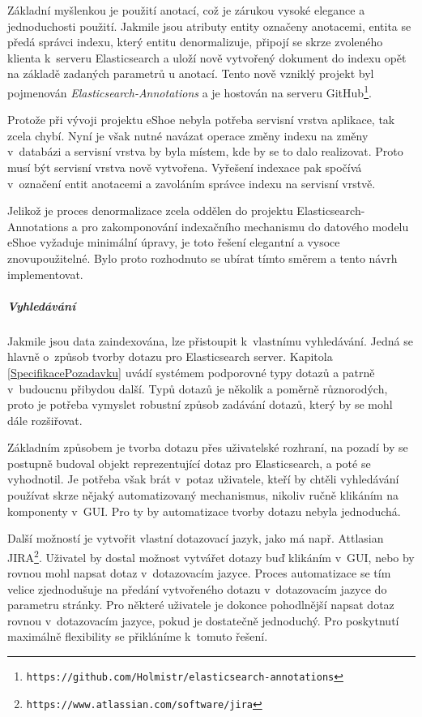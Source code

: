 \documentclass[11pt,oneside]{fithesis2}
\begin{document}
Základní myšlenkou je použití anotací, což je zárukou vysoké elegance a jednoduchosti použití. Jakmile jsou atributy entity označeny anotacemi, entita se předá správci indexu, který entitu denormalizuje, připojí se skrze zvoleného klienta k~serveru Elasticsearch a uloží nově vytvořený dokument do indexu opět na základě zadaných parametrů u anotací. Tento nově vzniklý projekt byl pojmenován \emph{Elasticsearch-Annotations} a je hostován na serveru GitHub\footnote{\texttt{https://github.com/Holmistr/elasticsearch-annotations}}.

Protože při vývoji projektu eShoe nebyla potřeba servisní vrstva aplikace, tak zcela chybí. Nyní je však nutné navázat operace změny indexu na změny v~databázi a servisní vrstva by byla místem, kde by se to dalo realizovat. Proto musí být servisní vrstva nově vytvořena. Vyřešení indexace pak spočívá v~označení entit anotacemi a zavoláním správce indexu na servisní vrstvě. 

Jelikož je proces denormalizace zcela oddělen do projektu Elasticsearch-Annotations a pro zakomponování indexačního mechanismu do datového modelu eShoe vyžaduje minimální úpravy, je toto řešení elegantní a vysoce znovupoužitelné. Bylo proto rozhodnuto se ubírat tímto směrem a tento návrh implementovat.

\subparagraph{Vyhledávání}
Jakmile jsou data zaindexována, lze přistoupit k~vlastnímu vyhledávání. Jedná se hlavně o~způsob tvorby dotazu pro Elasticsearch server. Kapitola \ref{SpecifikacePozadavku} uvádí systémem podporovné typy dotazů a patrně v~budoucnu přibydou další. Typů dotazů je několik a poměrně různorodých, proto je potřeba vymyslet robustní způsob zadávání dotazů, který by se mohl dále rozšiřovat.

Základním způsobem je tvorba dotazu přes uživatelské rozhraní, na pozadí by se postupně budoval objekt reprezentující dotaz pro Elasticsearch, a poté se vyhodnotil. Je potřeba však brát v~potaz uživatele, kteří by chtěli vyhledávání používat skrze nějaký automatizovaný mechanismus, nikoliv ručně klikáním na komponenty v~GUI. Pro ty by automatizace tvorby dotazu nebyla jednoduchá.

Další možností je vytvořit vlastní dotazovací jazyk, jako má např. Attlasian JIRA\footnote{\texttt{https://www.atlassian.com/software/jira}}. Uživatel by dostal možnost vytvářet dotazy buď klikáním v~GUI, nebo by rovnou mohl napsat dotaz v~dotazovacím jazyce. Proces automatizace se tím velice zjednodušuje na předání vytvořeného dotazu v~dotazovacím jazyce do parametru stránky. Pro některé uživatele je dokonce pohodlnější napsat dotaz rovnou v~dotazovacím jazyce, pokud je dostatečně jednoduchý. Pro poskytnutí maximálně flexibility se přikláníme k~tomuto řešení.
\end{document}

